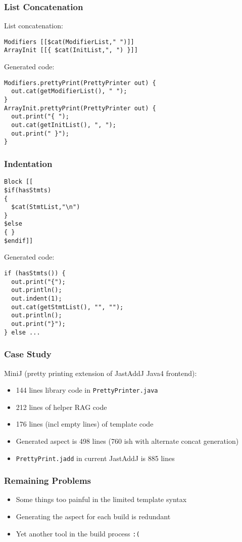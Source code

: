\documentclass[a4paper,12pt,presentation]{beamer}
\begin{document}
\begin{frame}[fragile]
    \frametitle{List Concatenation}
    List concatenation:
\begin{verbatim}
Modifiers [[$cat(ModifierList," ")]]
ArrayInit [[{ $cat(InitList,", ") }]]
\end{verbatim}

    Generated code:
\begin{verbatim}
Modifiers.prettyPrint(PrettyPrinter out) {
  out.cat(getModifierList(), " ");
}
ArrayInit.prettyPrint(PrettyPrinter out) {
  out.print("{ ");
  out.cat(getInitList(), ", ");
  out.print(" }");
}
\end{verbatim}
\end{frame}

\begin{frame}[fragile]
    \frametitle{Indentation}
\footnotesize\begin{verbatim}
Block [[
$if(hasStmts)
{
  $cat(StmtList,"\n")
}
$else
{ }
$endif]]
\end{verbatim}\normalsize

    Generated code:
\footnotesize\begin{verbatim}
if (hasStmts()) {
  out.print("{");
  out.println();
  out.indent(1);
  out.cat(getStmtList(), "", "");
  out.println();
  out.print("}");
} else ...
\end{verbatim}\normalsize
\end{frame}

\begin{frame}[fragile]
    \frametitle{Case Study}
    MiniJ (pretty printing extension of JastAddJ Java4 frontend):
    \begin{itemize}
        \item 144 lines library code in \verb'PrettyPrinter.java'
        \item 212 lines of helper RAG code
        \item 176 lines (incl empty lines) of template code
        \item Generated aspect is 498 lines (760 ish with alternate concat generation)
        \item \verb'PrettyPrint.jadd' in current JastAddJ is 885 lines
    \end{itemize}
\end{frame}

\begin{frame}[fragile]
    \frametitle{Remaining Problems}
    \begin{itemize}
        \item Some things too painful in the limited template syntax
        \item Generating the aspect for each build is redundant
        \item Yet another tool in the build process \verb':('
    \end{itemize}
\end{frame}
\end{document}
